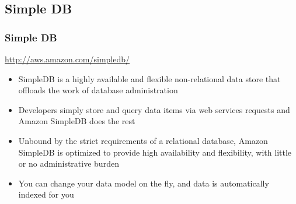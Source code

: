 \documentclass{beamer}
\begin{document}
\subsection{Simple DB}
\begin{frame}
\frametitle[Simple DB]{Simple DB}
\url{http://aws.amazon.com/simpledb/}

\begin{itemize}
  \item SimpleDB is a highly available and flexible non-relational data store that offloads the work of database administration
  \item Developers simply store and query data items via web services requests and Amazon SimpleDB does the rest
  \item Unbound by the strict requirements of a relational database, Amazon SimpleDB is optimized to provide high availability and flexibility, with little or no administrative burden
  \item You can change your data model on the fly, and data is automatically indexed for you
\end{itemize}
\end{frame}
\end{document}
